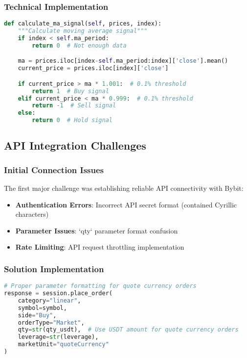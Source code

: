 \documentclass[12pt,a4paper]{article}
\begin{document}
\subsubsection{Technical Implementation}
\begin{lstlisting}[language=Python, caption=Initial Strategy Logic]
def calculate_ma_signal(self, prices, index):
    """Calculate moving average signal"""
    if index < self.ma_period:
        return 0  # Not enough data

    ma = prices.iloc[index-self.ma_period:index]['close'].mean()
    current_price = prices.iloc[index]['close']

    if current_price > ma * 1.001:  # 0.1% threshold
        return 1  # Buy signal
    elif current_price < ma * 0.999:  # 0.1% threshold
        return -1  # Sell signal
    else:
        return 0  # Hold signal
\end{lstlisting}

\subsection{API Integration Challenges}

\subsubsection{Initial Connection Issues}
The first major challenge was establishing reliable API connectivity with Bybit:

\begin{itemize}
\item \textbf{Authentication Errors}: Incorrect API secret format (contained Cyrillic characters)
\item \textbf{Parameter Issues}: `qty` parameter format confusion
\item \textbf{Rate Limiting}: API request throttling implementation
\end{itemize}

\subsubsection{Solution Implementation}
\begin{lstlisting}[language=Python, caption=API Authentication Fix]
# Proper parameter formatting for quote currency orders
response = session.place_order(
    category="linear",
    symbol=symbol,
    side="Buy",
    orderType="Market",
    qty=str(qty_usdt),  # Use USDT amount for quote currency orders
    leverage=str(leverage),
    marketUnit="quoteCurrency"
)
\end{lstlisting}
\end{document}
